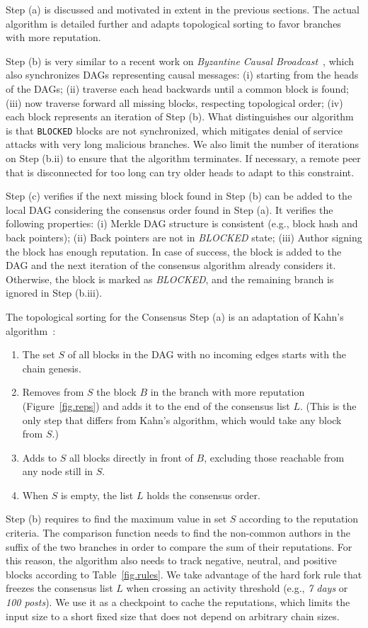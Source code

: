 \documentclass[10pt,journal,compsoc]{IEEEtran}
\newcommand{\code}[1]  {\texttt{\footnotesize{#1}}}
\begin{document}
Step (a) is discussed and motivated in extent in the previous sections.
The actual algorithm is detailed further and adapts topological sorting to
favor branches with more reputation.

Step (b) is very similar to a recent work on \emph{Byzantine Causal
Broadcast}~\cite{p2p.dag.sync}, which also synchronizes DAGs representing
causal messages:
    (i)   starting from the heads of the DAGs;
    (ii)  traverse each head backwards until a common block is found;
    (iii) now traverse forward all missing blocks, respecting topological order;
    (iv)  each block represents an iteration of Step (b).
What distinguishes our algorithm is that \code{BLOCKED} blocks are not
synchronized, which mitigates denial of service attacks with very long
malicious branches.
We also limit the number of iterations on Step (b.ii) to ensure that the
algorithm terminates.
If necessary, a remote peer that is disconnected for too long can try older
heads to adapt to this constraint.

Step (c) verifies if the next missing block found in Step (b) can be added to
the local DAG considering the consensus order found in Step (a).
It verifies the following properties:
    (i)   Merkle DAG structure is consistent (e.g., block hash and back pointers);
    (ii)  Back pointers are not in \emph{BLOCKED} state;
    (iii) Author signing the block has enough reputation.
In case of success, the block is added to the DAG and the next iteration of the
consensus algorithm already considers it.
Otherwise, the block is marked as \emph{BLOCKED}, and the remaining branch is
ignored in Step (b.iii).

The topological sorting for the Consensus Step (a) is an adaptation of Kahn's
algorithm~\cite{kahn}:
%
\begin{enumerate}
\item The set $S$ of all blocks in the DAG with no incoming edges starts with
      the chain genesis.
\item Removes from $S$ the block $B$ in the branch with more reputation
      (Figure~\ref{fig.reps}) and adds it to the end of the consensus list $L$.
      (This is the only step that differs from Kahn's algorithm, which would
      take any block from $S$.)
\item Adds to $S$ all blocks directly in front of $B$, excluding those
      reachable from any node still in $S$.
\item When $S$ is empty, the list $L$ holds the consensus order.
\end{enumerate}
%
Step (b) requires to find the maximum value in set $S$ according to the
reputation criteria.
The comparison function needs to find the non-common authors in the suffix of
the two branches in order to compare the sum of their reputations.
%
For this reason, the algorithm also needs to track negative, neutral, and
positive blocks according to Table~\ref{fig.rules}.
%
We take advantage of the hard fork rule that freezes the consensus list $L$
when crossing an activity threshold (e.g., \emph{7 days} or \emph{100 posts}).
We use it as a checkpoint to cache the reputations, which limits the input size
to a short fixed size that does not depend on arbitrary chain sizes.
\end{document}
